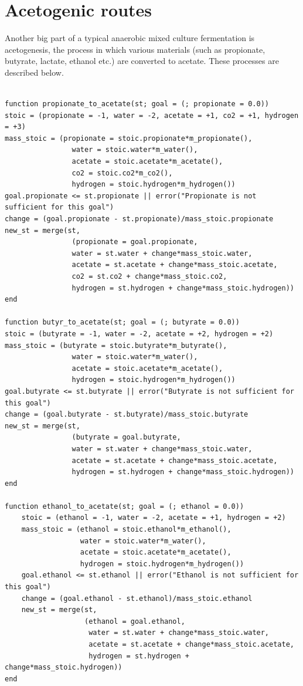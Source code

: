 \documentclass[11pt]{article}
\begin{document}
\section{Acetogenic routes}
\label{sec:orgebed82a}
Another big part of a typical anaerobic mixed culture fermentation is acetogenesis, the process in which various materials (such as propionate, butyrate, lactate, ethanol etc.) are converted to acetate. These processes are described below.

\begin{verbatim}

function propionate_to_acetate(st; goal = (; propionate = 0.0))
stoic = (propionate = -1, water = -2, acetate = +1, co2 = +1, hydrogen = +3)
mass_stoic = (propionate = stoic.propionate*m_propionate(),
                water = stoic.water*m_water(),
                acetate = stoic.acetate*m_acetate(),
                co2 = stoic.co2*m_co2(),
                hydrogen = stoic.hydrogen*m_hydrogen())
goal.propionate <= st.propionate || error("Propionate is not sufficient for this goal")
change = (goal.propionate - st.propionate)/mass_stoic.propionate
new_st = merge(st,
                (propionate = goal.propionate,
                water = st.water + change*mass_stoic.water,
                acetate = st.acetate + change*mass_stoic.acetate,
                co2 = st.co2 + change*mass_stoic.co2,
                hydrogen = st.hydrogen + change*mass_stoic.hydrogen))
end

function butyr_to_acetate(st; goal = (; butyrate = 0.0))
stoic = (butyrate = -1, water = -2, acetate = +2, hydrogen = +2)
mass_stoic = (butyrate = stoic.butyrate*m_butyrate(),
                water = stoic.water*m_water(),
                acetate = stoic.acetate*m_acetate(),
                hydrogen = stoic.hydrogen*m_hydrogen())
goal.butyrate <= st.butyrate || error("Butyrate is not sufficient for this goal")
change = (goal.butyrate - st.butyrate)/mass_stoic.butyrate
new_st = merge(st,
                (butyrate = goal.butyrate,
                water = st.water + change*mass_stoic.water,
                acetate = st.acetate + change*mass_stoic.acetate,
                hydrogen = st.hydrogen + change*mass_stoic.hydrogen))
end

function ethanol_to_acetate(st; goal = (; ethanol = 0.0))
    stoic = (ethanol = -1, water = -2, acetate = +1, hydrogen = +2)
    mass_stoic = (ethanol = stoic.ethanol*m_ethanol(),
                  water = stoic.water*m_water(),
                  acetate = stoic.acetate*m_acetate(),
                  hydrogen = stoic.hydrogen*m_hydrogen())
    goal.ethanol <= st.ethanol || error("Ethanol is not sufficient for this goal")
    change = (goal.ethanol - st.ethanol)/mass_stoic.ethanol
    new_st = merge(st,
                   (ethanol = goal.ethanol,
                    water = st.water + change*mass_stoic.water,
                    acetate = st.acetate + change*mass_stoic.acetate,
                    hydrogen = st.hydrogen + change*mass_stoic.hydrogen))
end


\end{verbatim}
\end{document}
